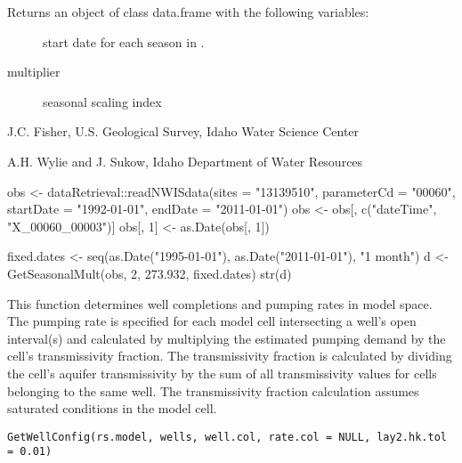 \documentclass[a4paper]{book}
\begin{document}
%
\begin{Value}
Returns an object of class data.frame with the following variables:
\begin{description}

\item[] start date for each season in .
\item[multiplier] seasonal scaling index

\end{description}

\end{Value}
%
\begin{Author}\relax
J.C. Fisher, U.S. Geological Survey, Idaho Water Science Center

A.H. Wylie and J. Sukow, Idaho Department of Water Resources
\end{Author}
%
\begin{Examples}
\begin{ExampleCode}
obs <- dataRetrieval::readNWISdata(sites = "13139510", parameterCd = "00060",
                                   startDate = "1992-01-01", endDate = "2011-01-01")
obs <- obs[, c("dateTime", "X_00060_00003")]
obs[, 1] <- as.Date(obs[, 1])

fixed.dates <- seq(as.Date("1995-01-01"), as.Date("2011-01-01"), "1 month")
d <- GetSeasonalMult(obs, 2, 273.932, fixed.dates)
str(d)

\end{ExampleCode}
\end{Examples}
%
\begin{Description}\relax
This function determines well completions and pumping rates in model space.
The pumping rate is specified for each model cell intersecting a well's open interval(s)
and calculated by multiplying the estimated pumping demand by the cell's transmissivity fraction.
The transmissivity fraction is calculated by dividing the cell's aquifer transmissivity by
the sum of all transmissivity values for cells belonging to the same well.
The transmissivity fraction calculation assumes saturated conditions in the model cell.
\end{Description}
%
\begin{Usage}
\begin{verbatim}
GetWellConfig(rs.model, wells, well.col, rate.col = NULL, lay2.hk.tol = 0.01)
\end{verbatim}
\end{Usage}
\end{document}
